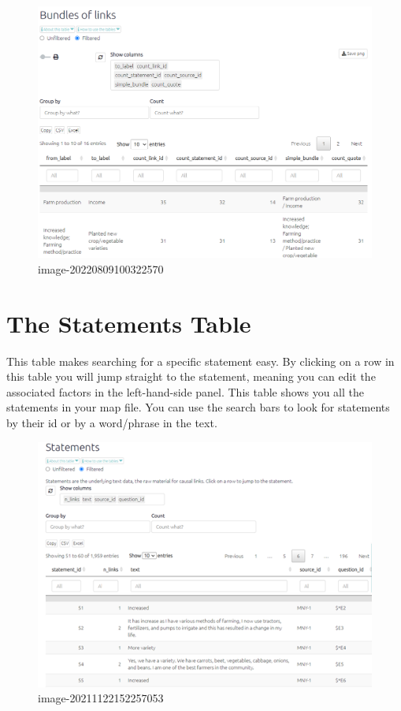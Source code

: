 \documentclass[
]{book}
\begin{document}
\begin{figure}
\centering
\includegraphics[width=6.77083in,height=\textheight]{_assets/image-20220809100322570.png}
\caption{image-20220809100322570}
\end{figure}

\hypertarget{xthe-statements-table-old}{%
\chapter{The Statements Table}\label{xthe-statements-table-old}}

This table makes searching for a specific statement easy. By clicking on a row in this table you will jump straight to the statement, meaning you can edit the associated factors in the left-hand-side panel. This table shows you all the statements in your map file. You can use the search bars to look for statements by their id or by a word/phrase in the text.

\begin{figure}
\centering
\includegraphics[width=6.77083in,height=\textheight]{_assets/image-20211122152257053.png}
\caption{image-20211122152257053}
\end{figure}
\end{document}
